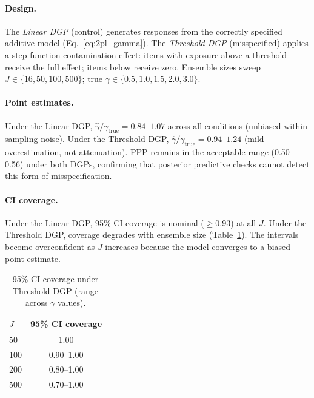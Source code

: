 \paragraph{Design.} The \emph{Linear DGP} (control) generates responses from the correctly specified additive model (Eq.~\ref{eq:2pl_gamma}). The \emph{Threshold DGP} (misspecified) applies a step-function contamination effect: items with exposure above a threshold receive the full effect; items below receive zero. Ensemble sizes sweep $J \in \{16, 50, 100, 500\}$; true $\gamma \in \{0.5, 1.0, 1.5, 2.0, 3.0\}$.

\paragraph{Point estimates.} Under the Linear DGP, $\hat{\gamma}/\gamma_{\text{true}} = 0.84$--$1.07$ across all conditions (unbiased within sampling noise). Under the Threshold DGP, $\hat{\gamma}/\gamma_{\text{true}} = 0.94$--$1.24$ (mild overestimation, not attenuation). PPP remains in the acceptable range (0.50--0.56) under both DGPs, confirming that posterior predictive checks cannot detect this form of misspecification.

\paragraph{CI coverage.} Under the Linear DGP, 95\% CI coverage is nominal ($\geq$0.93) at all $J$. Under the Threshold DGP, coverage degrades with ensemble size (Table~\ref{tab:dgp_coverage}). The intervals become overconfident as $J$ increases because the model converges to a biased point estimate.

\begin{table}[h]
\centering
\caption{95\% CI coverage under Threshold DGP (range across $\gamma$ values).}
\label{tab:dgp_coverage}
\footnotesize
\begin{tabular}{lc}
\toprule
$J$ & 95\% CI coverage \\
\midrule
50 & 1.00 \\
100 & 0.90--1.00 \\
200 & 0.80--1.00 \\
500 & 0.70--1.00 \\
\bottomrule
\end{tabular}
\end{table}


